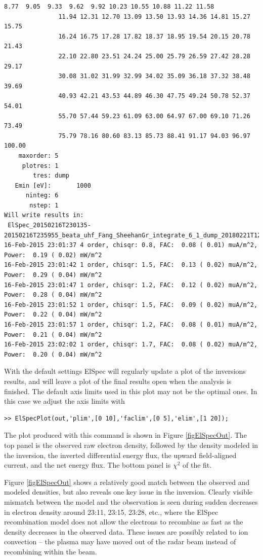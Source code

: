 \documentclass[12pt,a4paper]{report}
\begin{document}
\begin{lstlisting}[style=myMATLABsmall]
                8.77  9.05  9.33  9.62  9.92 10.23 10.55 10.88 11.22 11.58
               11.94 12.31 12.70 13.09 13.50 13.93 14.36 14.81 15.27 15.75
               16.24 16.75 17.28 17.82 18.37 18.95 19.54 20.15 20.78 21.43
               22.10 22.80 23.51 24.24 25.00 25.79 26.59 27.42 28.28 29.17
               30.08 31.02 31.99 32.99 34.02 35.09 36.18 37.32 38.48 39.69
               40.93 42.21 43.53 44.89 46.30 47.75 49.24 50.78 52.37 54.01
               55.70 57.44 59.23 61.09 63.00 64.97 67.00 69.10 71.26 73.49
               75.79 78.16 80.60 83.13 85.73 88.41 91.17 94.03 96.97 100.00
    maxorder: 5
     plotres: 1
        tres: dump
   Emin [eV]:       1000
      ninteg: 6
       nstep: 1
Will write results in:
 ElSpec_20150216T230135-20150216T235955_beata_uhf_Fang_SheehanGr_integrate_6_1_dump_20180221T123708.mat
16-Feb-2015 23:01:37 4 order, chisqr: 0.8, FAC:  0.08 ( 0.01) muA/m^2, Power:  0.19 ( 0.02) mW/m^2
16-Feb-2015 23:01:42 1 order, chisqr: 1.5, FAC:  0.13 ( 0.02) muA/m^2, Power:  0.29 ( 0.04) mW/m^2
16-Feb-2015 23:01:47 1 order, chisqr: 1.2, FAC:  0.12 ( 0.02) muA/m^2, Power:  0.28 ( 0.04) mW/m^2
16-Feb-2015 23:01:52 1 order, chisqr: 1.5, FAC:  0.09 ( 0.02) muA/m^2, Power:  0.22 ( 0.04) mW/m^2
16-Feb-2015 23:01:57 1 order, chisqr: 1.2, FAC:  0.08 ( 0.01) muA/m^2, Power:  0.21 ( 0.04) mW/m^2
16-Feb-2015 23:02:02 1 order, chisqr: 1.7, FAC:  0.08 ( 0.02) muA/m^2, Power:  0.20 ( 0.04) mW/m^2

\end{lstlisting}

With the default settings ElSpec will regularly update a plot of the inversions results, and will leave a plot of the final results open when the analysis is finished. The default axis limits used in this plot may not be the optimal ones. In this case we adjust the axis limits with
\begin{lstlisting}[style=myMATLAB]
>> ElSpecPlot(out,'plim',[0 10],'faclim',[0 5],'elim',[1 20]);
\end{lstlisting}

The plot produced with this command is shown in Figure \ref{figElSpecOut}. The top panel is the observed raw electron density, followed by the density modeled in the inversion, the inverted differential energy flux, the upward field-aligned current, and the net energy flux. The bottom panel is $\chi^2$ of the fit. 

Figure \ref{figElSpecOut} shows a relatively good match between the observed and modeled densities, but also reveals one key issue in the inversion. Clearly visible mismatch between the model and the observation is seen during sudden decreases in electron density around 23:11, 23:15, 23:28, etc., where the ElSpec recombination model does not allow the electrons to recombine as fast as the density decreases in the observed data. These issues are possibly related to ion convection -- the plasma may have moved out of the radar beam instead of recombining within the beam. 
\end{document}
